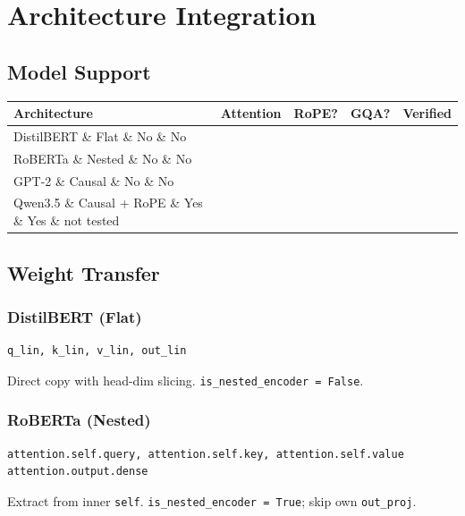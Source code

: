 
\section{Architecture Integration}

\subsection{Model Support}

\begin{table}[H]
\centering
\small
\begin{tabular}{lllll}
\toprule
\textbf{Architecture} & \textbf{Attention} & \textbf{RoPE?} & \textbf{GQA?} & \textbf{Verified} \\
\midrule
DistilBERT \& Flat \& No \& No &  \\
RoBERTa \& Nested \& No \& No &  \\
GPT-2 \& Causal \& No \& No &  \\
Qwen3.5 \& Causal + RoPE \& Yes \& Yes \& not tested \\
\bottomrule
\end{tabular}
\end{table}

\subsection{Weight Transfer}

\subsubsection{DistilBERT (Flat)}

\begin{lstlisting}
q_lin, k_lin, v_lin, out_lin
\end{lstlisting}

Direct copy with head-dim slicing. \texttt{is\_nested\_encoder = False}.

\subsubsection{RoBERTa (Nested)}

\begin{lstlisting}
attention.self.query, attention.self.key, attention.self.value
attention.output.dense
\end{lstlisting}

Extract from inner \texttt{self}. \texttt{is\_nested\_encoder = True}; skip own \texttt{out\_proj}.

